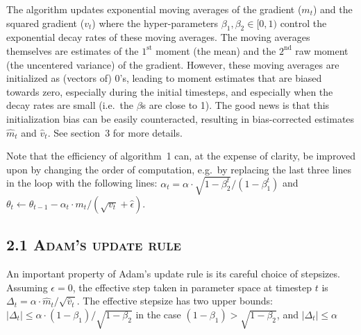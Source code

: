 \documentclass[11pt]{article}
\begin{document}
The algorithm updates exponential moving averages of the gradient
($m_t$) and the squared gradient ($v_t$) where the hyper-parameters
$\beta_1, \beta_2 \in [0, 1)$ control the exponential decay rates of
these moving averages. The moving averages themselves are estimates
of the $1^\text{st}$ moment (the mean) and the $2^\text{nd}$ raw
moment (the uncentered variance) of the gradient. However, these
moving averages are initialized as (vectors of) 0's, leading to
moment estimates that are biased towards zero, especially during
the initial timesteps, and especially when the decay rates are
small (i.e.\ the $\beta$s are close to 1). The good news is that
this initialization bias can be easily counteracted, resulting in
bias-corrected estimates $\widehat{m}_t$ and $\widehat{v}_t$. See
section~3 for more details.

Note that the efficiency of algorithm~1 can, at the expense of
clarity, be improved upon by changing the order of computation,
e.g.\ by replacing the last three lines in the loop with the
following lines:
$\alpha_t = \alpha \cdot \sqrt{1 - \beta_2^t}/(1 - \beta_1^t)$
and
$\theta_t \leftarrow \theta_{t-1} - \alpha_t \cdot m_t/(\sqrt{v_t} + \hat{\epsilon})$.

\subsection*{2.1 \textsc{Adam's update rule}}

An important property of Adam's update rule is its careful choice
of stepsizes. Assuming $\epsilon = 0$, the effective step taken in
parameter space at timestep $t$ is
$\Delta_t = \alpha \cdot \widehat{m}_t / \sqrt{\widehat{v}_t}$.
The effective stepsize has two upper bounds:
$|\Delta_t| \leq \alpha \cdot (1 - \beta_1) / \sqrt{1 - \beta_2}$ in
the case $(1 - \beta_1) > \sqrt{1 - \beta_2}$, and
$|\Delta_t| \leq \alpha$


\newpage

\setcounter{equation}{0}
\end{document}
